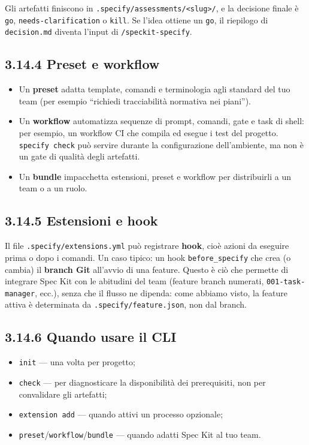 \documentclass[
  italian,
  10pt,
]{book}
\providecommand{\tightlist}{%
  \setlength{\itemsep}{0pt}\setlength{\parskip}{0pt}}
\begin{document}
Gli artefatti finiscono in
\texttt{.specify/assessments/\textless{}slug\textgreater{}/}, e la
decisione finale è \texttt{go}, \texttt{needs-clarification} o
\texttt{kill}. Se l'idea ottiene un \texttt{go}, il riepilogo di
\texttt{decision.md} diventa l'input di \texttt{/speckit-specify}.

\subsection{3.14.4 Preset e workflow}\label{preset-e-workflow}

\begin{itemize}
\tightlist
\item
  Un \textbf{preset} adatta template, comandi e terminologia agli
  standard del tuo team (per esempio ``richiedi tracciabilità normativa
  nei piani'').
\item
  Un \textbf{workflow} automatizza sequenze di prompt, comandi, gate e
  task di shell: per esempio, un workflow CI che compila ed esegue i
  test del progetto. \texttt{specify\ check} può servire durante la
  configurazione dell'ambiente, ma non è un gate di qualità degli
  artefatti.
\item
  Un \textbf{bundle} impacchetta estensioni, preset e workflow per
  distribuirli a un team o a un ruolo.
\end{itemize}

\subsection{3.14.5 Estensioni e hook}\label{estensioni-e-hook}

Il file \texttt{.specify/extensions.yml} può registrare \textbf{hook},
cioè azioni da eseguire prima o dopo i comandi. Un caso tipico: un hook
\texttt{before\_specify} che crea (o cambia) il \textbf{branch Git}
all'avvio di una feature. Questo è ciò che permette di integrare Spec
Kit con le abitudini del team (feature branch numerati,
\texttt{001-task-manager}, ecc.), senza che il flusso ne dipenda: come
abbiamo visto, la feature attiva è determinata da
\texttt{.specify/feature.json}, non dal branch.

\subsection{3.14.6 Quando usare il CLI}\label{quando-usare-il-cli}

\begin{itemize}
\tightlist
\item
  \texttt{init} --- una volta per progetto;
\item
  \texttt{check} --- per diagnosticare la disponibilità dei
  prerequisiti, non per convalidare gli artefatti;
\item
  \texttt{extension\ add} --- quando attivi un processo opzionale;
\item
  \texttt{preset}/\texttt{workflow}/\texttt{bundle} --- quando adatti
  Spec Kit al tuo team.
\end{itemize}
\end{document}
